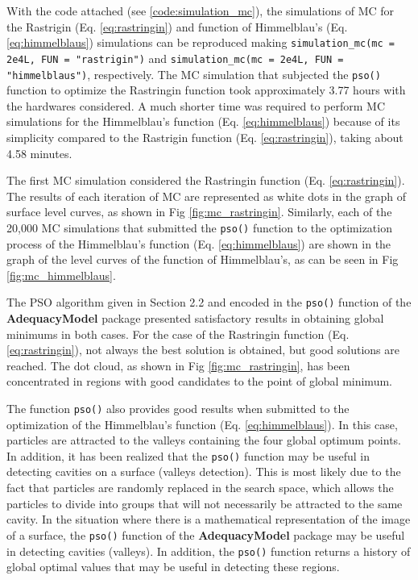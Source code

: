 \documentclass[10pt,letterpaper]{article}
\begin{document}
With the code attached (see \ref{code:simulation_mc}), the simulations of MC for the Rastrigin (Eq. \ref{eq:rastringin}) and function of Himmelblau's (Eq. \ref{eq:himmelblaus}) simulations can be reproduced making \texttt{simulation\_mc(mc = 2e4L, FUN = "rastrigin")} and \texttt{simulation\_mc(mc = 2e4L, FUN = "himmelblaus")}, respectively. The MC simulation that subjected the \texttt{pso()} function to optimize the Rastringin function took approximately 3.77 hours with the hardwares considered. A much shorter time was required to perform MC simulations for the Himmelblau's function (Eq. \ref{eq:himmelblaus}) because of its simplicity compared to the Rastrigin function (Eq. \ref{eq:rastringin}), taking about 4.58 minutes.

The first MC simulation considered the Rastringin function (Eq. \ref{eq:rastringin}). The results of each iteration of MC are represented as white dots in the graph of surface level curves, as shown in Fig \ref{fig:mc_rastringin}. Similarly, each of the 20,000 MC simulations that submitted the \texttt{pso()} function to the optimization process of the Himmelblau's function (Eq. \ref{eq:himmelblaus}) are shown in the graph of the level curves of the function of Himmelblau's, as can be seen in Fig \ref{fig:mc_himmelblaus}.

The PSO algorithm given in Section 2.2 and encoded in the \texttt{pso()} function of the \textbf{AdequacyModel} package presented satisfactory results in obtaining global minimums in both cases. For the case of the Rastringin function (Eq. \ref{eq:rastringin}), not always the best solution is obtained, but good solutions are reached. The dot cloud, as shown in Fig \ref{fig:mc_rastringin}, has been concentrated in regions with good candidates to the point of global minimum.

The function \texttt{pso()} also provides good results when submitted to the optimization of the Himmelblau's function (Eq. \ref{eq:himmelblaus}). In this case, particles are attracted to the valleys containing the four global optimum points. In addition, it has been realized that the \texttt{pso()} function may be useful in detecting cavities on a surface (valleys detection). This is most likely due to the fact that particles are randomly replaced in the search space, which allows the particles to divide into groups that will not necessarily be attracted to the same cavity. In the situation where there is a mathematical representation of the image of a surface, the \texttt{pso()} function of the \textbf{AdequacyModel} package may be useful in detecting cavities (valleys). In addition, the \texttt{pso()} function returns a history of global optimal values that may be useful in detecting these regions.
\end{document}
